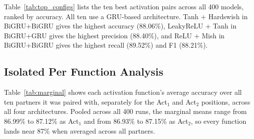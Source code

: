 \documentclass[conference]{IEEEtran}
\begin{document}
Table~\ref{tab:top_configs} lists the ten best activation pairs across all 400
models, ranked by accuracy. All ten use a GRU-based architecture.
Tanh + Hardswish in BiGRU+BiGRU gives the highest accuracy (88.06\%),
LeakyReLU + Tanh in BiGRU+GRU gives the highest precision (88.40\%),
and ReLU + Mish in BiGRU+BiGRU gives the highest recall (89.52\%) and F1
(88.21\%).

\begin{table}[htbp]
  \caption{Top 10 Configurations Across All 400 Runs}
  \label{tab:top_configs}
  \centering\footnotesize
  \renewcommand{\arraystretch}{1.1}
\end{table}





\subsection{Isolated Per Function Analysis}

Table~\ref{tab:marginal} shows each activation function's average accuracy
over all ten partners it was paired with, separately for the Act$_1$
and Act$_2$ positions, across all four architectures. Pooled across
all 400 runs, the marginal means range from 86.99\% to 87.12\%
as Act$_1$ and from 86.93\% to 87.15\% as Act$_2$, so every function
lands near 87\% when averaged across all partners.
\end{document}
